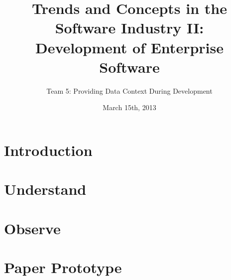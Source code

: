 \documentclass[runningheads]{llncs}
\begin{document}
\mainmatter
\title{Trends and Concepts in the Software Industry II: \\ Development of Enterprise Software}
\author{Team 5: Providing Data Context During Development}
\date{March 15th, 2013}
\maketitle

\newpage

\tableofcontents
\newpage


\section{Introduction}




\section{Understand} \label{sec:UNDERSTAND}


\section{Observe} \label{sec:OBSERVE}






\section{Paper Prototype} \label{sec:PAPER_PROTOTYPE}
\end{document}
